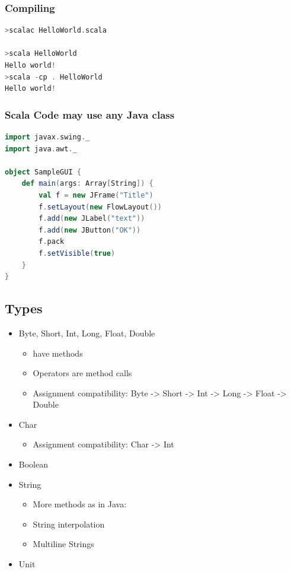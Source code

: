 \hypertarget{compiling}{%
\subsubsection{Compiling}\label{compiling}}

\begin{lstlisting}[language=scala]
>scalac HelloWorld.scala

>scala HelloWorld
Hello world!
>scala -cp . HelloWorld
Hello world!
\end{lstlisting}

\hypertarget{scala-code-may-use-any-java-class}{%
\subsubsection{Scala Code may use any Java
class}\label{scala-code-may-use-any-java-class}}

\begin{lstlisting}[language=scala]
import javax.swing._
import java.awt._

object SampleGUI {
    def main(args: Array[String]) {
        val f = new JFrame("Title")
        f.setLayout(new FlowLayout())
        f.add(new JLabel("text"))
        f.add(new JButton("OK"))
        f.pack
        f.setVisible(true)
    }
}
\end{lstlisting}

\hypertarget{types}{%
\subsection{Types}\label{types}}

\begin{itemize}
\tightlist
\item
  Byte, Short, Int, Long, Float, Double

  \begin{itemize}
  \tightlist
  \item
    have methods
  \item
    Operators are method calls
  \item
    Assignment compatibility: Byte -\textgreater{} Short -\textgreater{}
    Int -\textgreater{} Long -\textgreater{} Float -\textgreater{}
    Double
  \end{itemize}
\item
  Char

  \begin{itemize}
  \tightlist
  \item
    Assignment compatibility: Char -\textgreater{} Int
  \end{itemize}
\item
  Boolean
\item
  String

  \begin{itemize}
  \tightlist
  \item
    More methods as in Java:
  \item
    String interpolation
  \item
    Multiline Strings
  \end{itemize}
\item
  Unit
\end{itemize}

